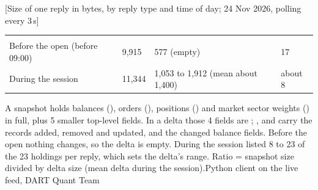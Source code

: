 [Size of one  reply in bytes, by reply type and time of day; 24 Nov 2026, polling every 3\,s]{%
{\tabfont\begin{tabularx}{\linewidth}{>{\RaggedRight\arraybackslash}X R{26mm} R{50mm} R{14mm}}
 &  &  & \\
\rowsep
Before the open (before 09:00) & 9,915 & 577 (empty) & 17\\
\rowsep
During the session & 11,344 & 1,053 to 1,912 (mean about 1,400) & about 8\\
\end{tabularx}}
}{A snapshot holds balances (), orders (), positions () and market sector weights () in full, plus 5 smaller top-level fields. In a delta those 4 fields are ; ,  and  carry the records added, removed and updated, and  the changed balance fields. Before the open nothing changes, so the delta is empty. During the session  listed 8 to 23 of the 23 holdings per reply, which sets the delta's range. Ratio = snapshot size divided by delta size (mean delta during the session).}{Python client on the live feed, DART Quant Team}
